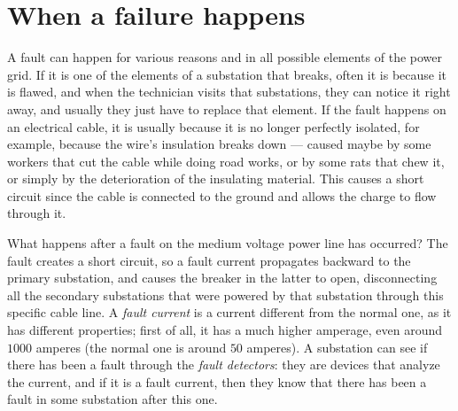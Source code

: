 \section{When a failure happens}

A fault can happen for various reasons and in all possible elements of the power grid. If it is one of the elements of a substation that breaks, often it is because it is flawed, and when the technician visits that substations, they can notice it right away, and usually they just have to replace that element. If the fault happens on an electrical cable, it is usually because it is no longer perfectly isolated, for example, because the wire's insulation breaks down --- caused maybe by some workers that cut the cable while doing road works, or by some rats that chew it, or simply by the deterioration of the insulating material. This causes a short circuit since the cable is connected to the ground and allows the charge to flow through it.

What happens after a fault on the medium voltage power line has occurred? The fault creates a short circuit, so a fault current propagates backward to the primary substation, and causes the breaker in the latter to open, disconnecting all the secondary substations that were powered by that substation through this specific cable line. A \emph{fault current} is a current different from the normal one, as it has different properties; first of all, it has a much higher amperage, even around $1000$ amperes (the normal one is around $50$ amperes). A substation can see if there has been a fault through the \emph{fault detectors}: they are devices that analyze the current, and if it is a fault current, then they know that there has been a fault in some substation after this one.

